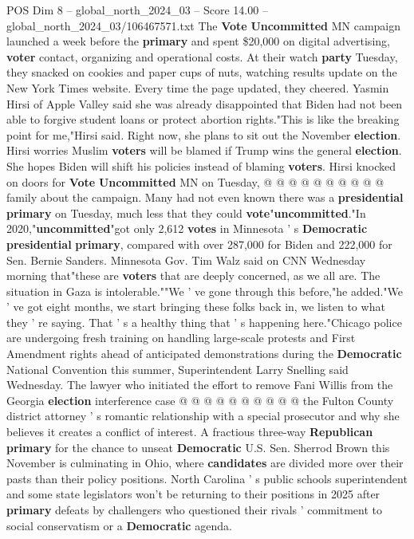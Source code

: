 \begin{textsample}{POS Dim 8 – global\_north\_2024\_03 – Score 14.00 – global\_north\_2024\_03/106467571.txt}
The \textbf{Vote} \textbf{Uncommitted} MN campaign launched a week before the \textbf{primary} and spent \$20,000 on digital advertising, \textbf{voter} contact, organizing and operational costs.
At their watch \textbf{party} Tuesday, they snacked on cookies and paper cups of nuts, watching results update on the New York Times website.
Every time the page updated, they cheered.
Yasmin Hirsi of Apple Valley said she was already disappointed that Biden had not been able to forgive student loans or protect abortion rights."This is like the breaking point for me,"Hirsi said.
Right now, she plans to sit out the November \textbf{election}.
Hirsi worries Muslim \textbf{voters} will be blamed if Trump wins the general \textbf{election}.
She hopes Biden will shift his policies instead of blaming \textbf{voters}.
Hirsi knocked on doors for \textbf{Vote} \textbf{Uncommitted} MN on Tuesday, @ @ @ @ @ @ @ @ @ @ family about the campaign.
Many had not even known there was a \textbf{presidential} \textbf{primary} on Tuesday, much less that they could \textbf{vote}"\textbf{uncommitted}."In 2020,"\textbf{uncommitted}"got only 2,612 \textbf{votes} in Minnesota ' s \textbf{Democratic} \textbf{presidential} \textbf{primary}, compared with over 287,000 for Biden and 222,000 for Sen.
Bernie Sanders.
Minnesota Gov.
Tim Walz said on CNN Wednesday morning that"these are \textbf{voters} that are deeply concerned, as we all are.
The situation in Gaza is intolerable.""We ' ve gone through this before,"he added."We ' ve got eight months, we start bringing these folks back in, we listen to what they ' re saying.
That ' s a healthy thing that ' s happening here."Chicago police are undergoing fresh training on handling large-scale protests and First Amendment rights ahead of anticipated demonstrations during the \textbf{Democratic} National Convention this summer, Superintendent Larry Snelling said Wednesday.
The lawyer who initiated the effort to remove Fani Willis from the Georgia \textbf{election} interference case @ @ @ @ @ @ @ @ @ @ the Fulton County district attorney ' s romantic relationship with a special prosecutor and why she believes it creates a conflict of interest.
A fractious three-way \textbf{Republican} \textbf{primary} for the chance to unseat \textbf{Democratic} U.S.
Sen.
Sherrod Brown this November is culminating in Ohio, where \textbf{candidates} are divided more over their pasts than their policy positions.
North Carolina ' s public schools superintendent and some state legislators won't be returning to their positions in 2025 after \textbf{primary} defeats by challengers who questioned their rivals ' commitment to social conservatism or a \textbf{Democratic} agenda.

\end{textsample}
